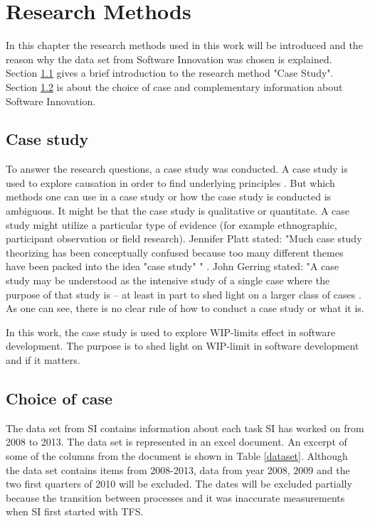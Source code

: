 \documentclass[UKenglish]{ifimaster}  %
\begin{document}
\chapter{Research Methods}
\label{chap:RM}
In this chapter the research methods used in this work will be introduced and the reason why the data set from Software Innovation was chosen is explained. Section \ref{sec:CS} gives a brief introduction to the research method "Case Study".  Section \ref{sec:coc} is about the choice of case and complementary information about Software Innovation. 


\section{Case study}
\label{sec:CS}
To answer the research questions, a case study was conducted.  A case study is used to explore causation in order to find underlying principles \parencite{0078285763}\parencite{9781412960991}.  But which methods one can use in a case study or how the case study is conducted is ambiguous.  It might be that the case study is qualitative or quantitate.  A case study might utilize a particular type of evidence (for example ethnographic, participant observation or field research).  Jennifer Platt stated: "Much case study theorizing has been conceptually confused because too many different themes have been packed into the idea "case study" " \parencite{0521676568}.  John Gerring stated: "A case study may be understood as the intensive study of a single case where the purpose of that study is -- at least in part to shed light on a larger class of cases  \parencite{0521676568}. As one can see, there is no clear rule of how to conduct a case study or what it is. 


In this work, the case study is used to explore WIP-limits effect in software development. The purpose is to shed light on WIP-limit in software development and if it matters.

\section{Choice of case}
\label{sec:coc}
The data set from SI contains information about each task SI has worked on from 2008 to 2013. The data set is represented in an excel document. An excerpt of some of the columns from the document is shown in Table \ref{dataset}. Although the data set contains items from 2008-2013, data from year 2008, 2009 and the two first quarters of 2010 will be excluded. The dates will be excluded partially because the transition between processes and it was inaccurate measurements when SI first started with TFS.
\end{document}
